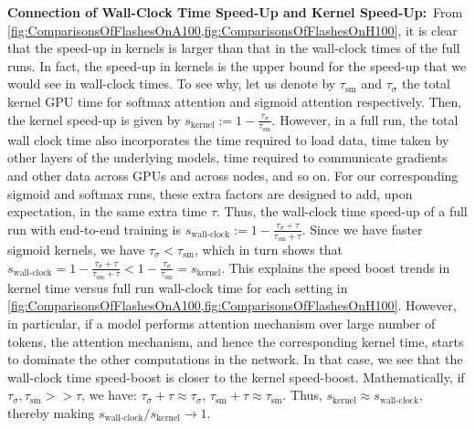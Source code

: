 \noindent\textbf{Connection of Wall-Clock Time Speed-Up and Kernel Speed-Up:}\ 
From \cref{fig:ComparisonsOfFlashesOnA100,fig:ComparisonsOfFlashesOnH100}, it is clear that the speed-up in kernels is larger than that in the wall-clock times of the full runs.
In fact, the speed-up in kernels is the upper bound for the speed-up that we would see in wall-clock times.
To see why, let us denote by $\tau_{\textrm{sm}}$ and $\tau_{\sigma}$ the total kernel GPU time for softmax attention and sigmoid attention respectively. 
Then, the kernel speed-up is given by $s_{\textrm{kernel}} := 1 -  \frac{\tau_{\sigma}}{\tau_{\textrm{sm}}}$. 
However, in a full run, the total wall clock time also incorporates the time required to load data, time taken by other layers of the underlying models, time required to communicate gradients and other data across GPUs and across nodes, and so on.
For our corresponding sigmoid and softmax runs, these extra factors are designed to add, upon expectation, in the same extra time $\tau$.
Thus, the wall-clock time speed-up of a full run with end-to-end training is $s_{\textrm{wall-clock}} := 1 - \frac{\tau_{\sigma} + \tau}{\tau_{\textrm{sm}} + \tau}$. 
Since we have faster sigmoid kernels, we have $\tau_\sigma < \tau_{\textrm{sm}}$, which in turn shows that $s_{\textrm{wall-clock}} = 1 - \frac{\tau_{\sigma} + \tau}{\tau_{\textrm{sm}} + \tau} <  1 -  \frac{\tau_{\sigma}}{\tau_{\textrm{sm}}} = s_{\textrm{kernel}}$. 
This explains the speed boost trends in kernel time versus full run wall-clock time for each setting in \cref{fig:ComparisonsOfFlashesOnA100,fig:ComparisonsOfFlashesOnH100}. 
However, in particular, if a model performs attention mechanism over large number of tokens, the attention mechanism, and hence the corresponding kernel time, starts to dominate the other computations in the network. 
In that case, we see that the wall-clock time speed-boost is closer to the kernel speed-boost.
Mathematically, if $\tau_{\sigma}, \tau_{\textrm{sm}} >\!\!> \tau$, we have: $\tau_{\sigma} + \tau\approx \tau_{\sigma}$, $\tau_{\textrm{sm}} + \tau\approx \tau_{\textrm{sm}}$. 
Thus, $s_{\textrm{kernel}}\approx s_{\textrm{wall-clock}}$, thereby making ${s_{\textrm{wall-clock}}}/{s_{\textrm{kernel}}}\rightarrow 1$. 


